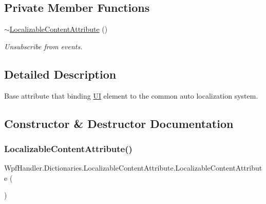 \subsection*{Private Member Functions}
\begin{DoxyCompactItemize}
\item 
\mbox{\hyperlink{class_wpf_handler_1_1_dictionaries_1_1_localizable_content_attribute_a38a1f37df12d6f6205ab32933ddeb5b1}{$\sim$\+Localizable\+Content\+Attribute}} ()
\begin{DoxyCompactList}\small\item\em Unsubscribe from events. \end{DoxyCompactList}\end{DoxyCompactItemize}


\subsection{Detailed Description}
Base attribute that binding \mbox{\hyperlink{namespace_wpf_handler_1_1_u_i}{UI}} element to the common auto localization system. 



\subsection{Constructor \& Destructor Documentation}
\mbox{\label{class_wpf_handler_1_1_dictionaries_1_1_localizable_content_attribute_abba3c6699a97cc5a417eebc194979acd}} 
\subsubsection{\texorpdfstring{Localizable\+Content\+Attribute()}{LocalizableContentAttribute()}}
{\footnotesize\ttfamily Wpf\+Handler.\+Dictionaries.\+Localizable\+Content\+Attribute.\+Localizable\+Content\+Attribute (\begin{DoxyParamCaption}{ }\end{DoxyParamCaption})}



